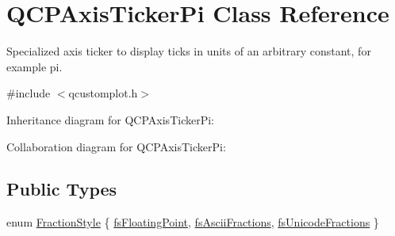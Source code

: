 \hypertarget{class_q_c_p_axis_ticker_pi}{}\section{Q\+C\+P\+Axis\+Ticker\+Pi Class Reference}
\label{class_q_c_p_axis_ticker_pi}


Specialized axis ticker to display ticks in units of an arbitrary constant, for example pi.  




{\ttfamily \#include $<$qcustomplot.\+h$>$}



Inheritance diagram for Q\+C\+P\+Axis\+Ticker\+Pi\+:


Collaboration diagram for Q\+C\+P\+Axis\+Ticker\+Pi\+:
\subsection*{Public Types}
\begin{DoxyCompactItemize}
\item 
enum \hyperlink{class_q_c_p_axis_ticker_pi_a262f1534c7f0c79a7d5237f5d1e2c54c}{Fraction\+Style} \{ \hyperlink{class_q_c_p_axis_ticker_pi_a262f1534c7f0c79a7d5237f5d1e2c54ca00f097b669b2a0e22f508f1ae97877d8}{fs\+Floating\+Point}, 
\hyperlink{class_q_c_p_axis_ticker_pi_a262f1534c7f0c79a7d5237f5d1e2c54ca05a5457e0e14cb726f623e25282066b3}{fs\+Ascii\+Fractions}, 
\hyperlink{class_q_c_p_axis_ticker_pi_a262f1534c7f0c79a7d5237f5d1e2c54ca92f38a938c8b179b23363d9993681c55}{fs\+Unicode\+Fractions}
 \}
\end{DoxyCompactItemize}
